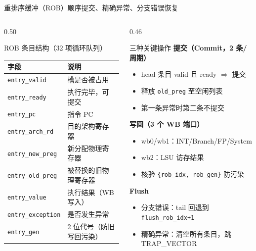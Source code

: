 \documentclass[aspectratio=169,xcolor={dvipsnames,svgnames},10pt]{beamer}
\newcommand{\code}[1]{\texttt{\small\color{PrimaryBlue}#1}}
\begin{document}
\begin{frame}{重排序缓冲（ROB）}{顺序提交、精确异常、分支错误恢复}
  \begin{columns}[T]
    \begin{column}{0.50\textwidth}
      \begin{block}{ROB 条目结构（32 项循环队列）}
        \small\renewcommand{\arraystretch}{1.15}
        \begin{tabular}{ll}
          \toprule
          \textbf{字段} & \textbf{说明} \\
          \midrule
          \code{entry\_valid}    & 槽是否被占用 \\
          \code{entry\_ready}    & 执行完毕，可提交 \\
          \code{entry\_pc}       & 指令 PC \\
          \code{entry\_arch\_rd} & 目的架构寄存器 \\
          \code{entry\_new\_preg}& 新分配物理寄存器 \\
          \code{entry\_old\_preg}& 被替换的旧物理寄存器 \\
          \code{entry\_value}    & 执行结果（WB 写入）\\
          \code{entry\_exception}& 是否发生异常 \\
          \code{entry\_gen}      & 2 位代号（防旧写回污染）\\
          \bottomrule
        \end{tabular}
      \end{block}
    \end{column}
    \begin{column}{0.46\textwidth}
      \begin{block}{三种关键操作}
        \small
        \textbf{提交（Commit，2 条/周期）}
        \begin{itemize}
          \item head 条目 valid 且 ready $\Rightarrow$ 提交
          \item 释放 \code{old\_preg} 至空闲列表
          \item 第一条异常时第二条不提交
        \end{itemize}
        \vspace{0.1cm}
        \textbf{写回（3 个 WB 端口）}
        \begin{itemize}
          \item wb0/wb1：INT/Branch/FP/System
          \item wb2：LSU 访存结果
          \item 核验 \code{\{rob\_idx, rob\_gen\}} 防污染
        \end{itemize}
        \vspace{0.1cm}
        \textbf{Flush}
        \begin{itemize}
          \item 分支错误：tail 回退到 \code{flush\_rob\_idx+1}
          \item 精确异常：清空所有条目，跳 TRAP\_VECTOR
        \end{itemize}
      \end{block}
    \end{column}
  \end{columns}
\end{frame}
\end{document}
